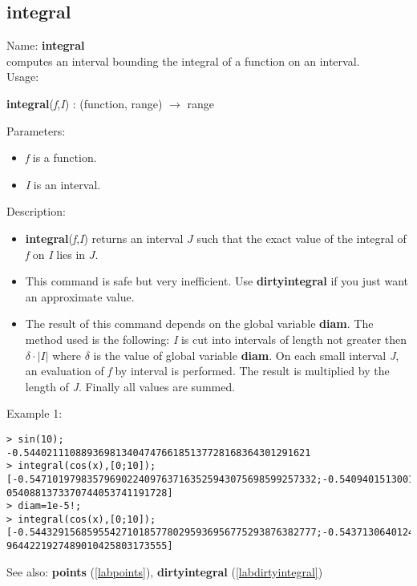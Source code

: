 \subsection{integral}
\label{labintegral}
\noindent Name: \textbf{integral}\\
computes an interval bounding the integral of a function on an interval.\\
\noindent Usage: 
\begin{center}
\textbf{integral}(\emph{f},\emph{I}) : (\textsf{function}, \textsf{range}) $\rightarrow$ \textsf{range}\\
\end{center}
Parameters: 
\begin{itemize}
\item \emph{f} is a function.
\item \emph{I} is an interval.
\end{itemize}
\noindent Description: \begin{itemize}

\item \textbf{integral}(\emph{f},\emph{I}) returns an interval $J$ such that the exact value of 
   the integral of \emph{f} on \emph{I} lies in $J$.

\item This command is safe but very inefficient. Use \textbf{dirtyintegral} if you just want
   an approximate value.

\item The result of this command depends on the global variable \textbf{diam}.
   The method used is the following: \emph{I} is cut into intervals of length not 
   greater then $\delta \cdot |I|$ where $\delta$ is the value
   of global variable \textbf{diam}.
   On each small interval \emph{J}, an evaluation of \emph{f} by interval is
   performed. The result is multiplied by the length of \emph{J}. Finally all values 
   are summed.
\end{itemize}
\noindent Example 1: 
\begin{center}\begin{minipage}{15cm}\begin{Verbatim}[frame=single]
> sin(10);
-0.54402111088936981340474766185137728168364301291621
> integral(cos(x),[0;10]);
[-0.54710197983579690224097637163525943075698599257332;-0.5409401513001318384815
0540881373370744053741191728]
> diam=1e-5!;
> integral(cos(x),[0;10]);
[-0.54432915685955427101857780295936956775293876382777;-0.5437130640124996950803
9644221927489010425803173555]
\end{Verbatim}
\end{minipage}\end{center}
See also: \textbf{points} (\ref{labpoints}), \textbf{dirtyintegral} (\ref{labdirtyintegral})
